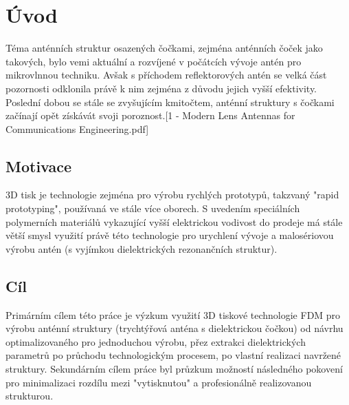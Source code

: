\chapter{Úvod}
Téma anténních struktur osazených čočkami, zejména anténních čoček jako takových, bylo vemi aktuální a rozvíjené v počátcích vývoje antén pro mikrovlnnou techniku. Avšak s příchodem reflektorových antén se velká část pozornosti odklonila právě k nim zejména z důvodu jejich vyšší efektivity. Poslední dobou se stále se zvyšujícím kmitočtem, anténní struktury s čočkami začínají opět získávát svoji poroznost.[1 -  Modern Lens Antennas for Communications Engineering.pdf]

\section{Motivace}
3D tisk je technologie zejména pro výrobu rychlých prototypů, takzvaný "rapid prototyping", používaná ve stále více oborech. S uvedením speciálních polymerních materiálů vykazující vyšší elektrickou vodivost do prodeje má stále větší smysl využití právě této technologie pro urychlení vývoje a malosériovou výrobu antén (s vyjímkou dielektrických rezonančních struktur).

\section{Cíl}
Primárním cílem této práce je výzkum využití 3D tiskové technologie FDM pro výrobu anténní struktury (trychtýřová anténa s dielektrickou čočkou) od návrhu optimalizovaného pro jednoduchou výrobu, přez extrakci dielektrických parametrů po průchodu technologickým procesem, po vlastní realizaci navržené struktury. Sekundárním cílem práce byl průzkum možností následného pokovení pro minimalizaci rozdílu mezi "vytisknutou" a profesionálně realizovanou strukturou.